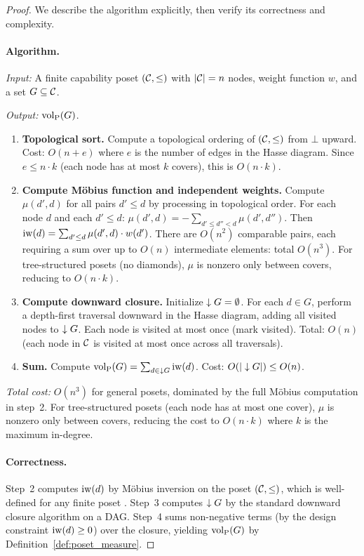 \begin{proof}
We describe the algorithm explicitly, then verify its correctness and
complexity.

\paragraph{Algorithm.}

\emph{Input:} A finite capability poset $(\mathcal{C}, \leq)$ with $|\mathcal{C}| = n$ nodes,
weight function $w$, and a set $G \subseteq \mathcal{C}$.

\emph{Output:} ${\operatorname{vol}_{\mathrm{P}}}(G)$.

\begin{enumerate}
\item \textbf{Topological sort.} Compute a topological ordering of $(\mathcal{C},
  \leq)$ from $\bot$ upward. Cost: $O(n + e)$ where $e$ is the number of
  edges in the Hasse diagram. Since $e \leq n \cdot k$ (each node has at most
  $k$ covers), this is $O(n \cdot k)$.

\item \textbf{Compute M\"{o}bius function and independent weights.} Compute
  $\mu(d', d)$ for all pairs $d' \leq d$ by processing in topological order.
  For each node $d$ and each $d' \leq d$:
  $\mu(d', d) = -\sum_{d' \leq d'' < d} \mu(d', d'')$.
  Then $\operatorname{iw}(d) = \sum_{d' \leq d} \mu(d', d) \cdot w(d')$.
  There are $O(n^2)$ comparable pairs, each requiring a sum over up to
  $O(n)$ intermediate elements: total $O(n^3)$. For tree-structured posets
  (no diamonds), $\mu$ is nonzero only between covers, reducing to
  $O(n \cdot k)$.

\item \textbf{Compute downward closure.} Initialize $\downarrow G = \emptyset$.
  For each $d \in G$, perform a depth-first traversal downward in the Hasse
  diagram, adding all visited nodes to $\downarrow G$. Each node is visited at most
  once (mark visited). Total: $O(n)$ (each node in $\mathcal{C}$ is visited at most
  once across all traversals).

\item \textbf{Sum.} Compute ${\operatorname{vol}_{\mathrm{P}}}(G) = \sum_{d \in \downarrow G} \operatorname{iw}(d)$. Cost:
  $O(|\downarrow G|) \leq O(n)$.
\end{enumerate}

\emph{Total cost:} $O(n^3)$ for general posets, dominated by the full
M\"{o}bius computation in step~2. For tree-structured posets (each node
has at most one cover), $\mu$ is nonzero only between covers, reducing the
cost to $O(n \cdot k)$ where $k$ is the maximum in-degree.

\paragraph{Correctness.} Step~2 computes $\operatorname{iw}(d)$ by M\"{o}bius inversion on
the poset $(\mathcal{C}, \leq)$, which is well-defined for any finite poset
\citep{rota1964foundations}. Step~3 computes $\downarrow G$ by the standard downward
closure algorithm on a DAG. Step~4 sums non-negative terms (by the design
constraint $\operatorname{iw}(d) \geq 0$) over the closure, yielding ${\operatorname{vol}_{\mathrm{P}}}(G)$ by
Definition~\ref{def:poset_measure}.
\end{proof}

